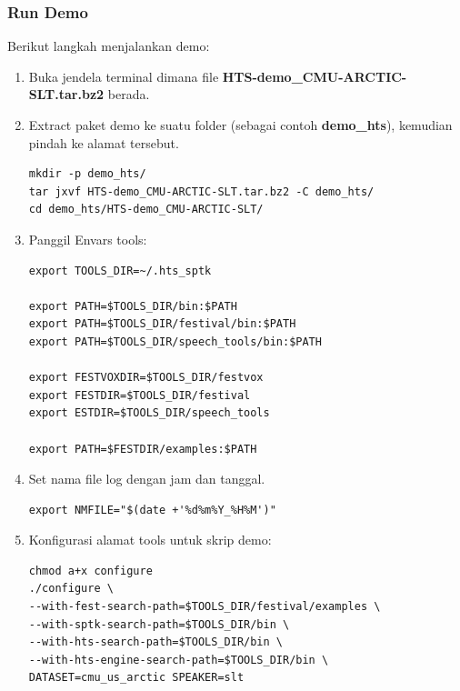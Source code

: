 \documentclass[12pt,]{article}
\begin{document}
	\subsubsection{Run Demo}
	Berikut langkah menjalankan demo:
	
	\begin{enumerate}
		\item Buka jendela terminal dimana file \textbf{HTS-demo\_CMU-ARCTIC-SLT.tar.bz2} berada.
		
		\item Extract paket demo ke suatu folder (sebagai contoh \textbf{demo\_hts}), kemudian pindah ke alamat tersebut.
		\begin{verbatim}
mkdir -p demo_hts/
tar jxvf HTS-demo_CMU-ARCTIC-SLT.tar.bz2 -C demo_hts/
cd demo_hts/HTS-demo_CMU-ARCTIC-SLT/
		\end{verbatim}
		
		\item Panggil Envars tools:
		\begin{verbatim}
export TOOLS_DIR=~/.hts_sptk

export PATH=$TOOLS_DIR/bin:$PATH
export PATH=$TOOLS_DIR/festival/bin:$PATH
export PATH=$TOOLS_DIR/speech_tools/bin:$PATH

export FESTVOXDIR=$TOOLS_DIR/festvox
export FESTDIR=$TOOLS_DIR/festival
export ESTDIR=$TOOLS_DIR/speech_tools

export PATH=$FESTDIR/examples:$PATH
		\end{verbatim}
		
		\newpage
		\item Set nama file log dengan jam dan tanggal.
		\begin{verbatim}
export NMFILE="$(date +'%d%m%Y_%H%M')"
		\end{verbatim}
		
		\item Konfigurasi alamat tools untuk skrip demo:
		\begin{verbatim}
chmod a+x configure
./configure \
--with-fest-search-path=$TOOLS_DIR/festival/examples \
--with-sptk-search-path=$TOOLS_DIR/bin \
--with-hts-search-path=$TOOLS_DIR/bin \
--with-hts-engine-search-path=$TOOLS_DIR/bin \
DATASET=cmu_us_arctic SPEAKER=slt
		\end{verbatim}


\end{enumerate}
\end{document}
